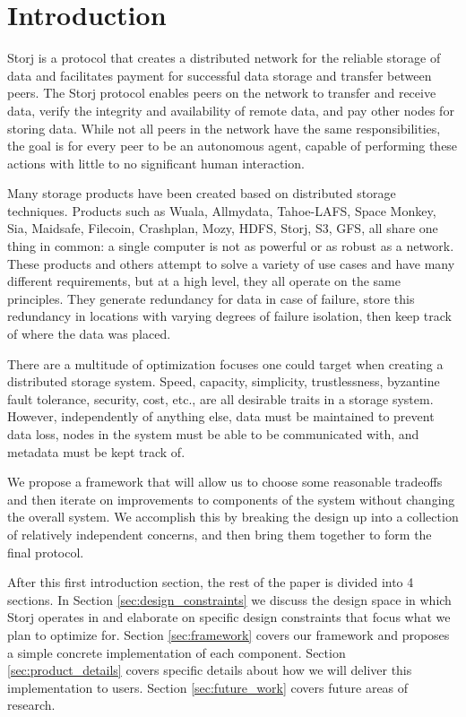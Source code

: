 \documentclass[a4paper,10pt]{article} \usepackage[utf8]{inputenc}
\begin{document}
\section{Introduction}

Storj is a protocol that creates a distributed network for the reliable storage
of data and facilitates payment for successful data storage and transfer
between peers.
The Storj protocol enables peers on the network to transfer and receive data,
verify the integrity and availability of remote data, and pay other nodes
for storing data.
While not all peers in the network have the same responsibilities,
the goal is for every peer to be an autonomous agent, capable of performing
these actions with little to no significant human interaction.

Many storage products have been created based on distributed storage techniques.
Products such as Wuala, Allmydata, Tahoe-LAFS, Space Monkey, Sia, Maidsafe,
Filecoin, Crashplan, Mozy, HDFS, Storj, S3, GFS, all share one thing in common:
a single computer is not as powerful or as robust as a network. These products
and others attempt to solve a variety of use cases and have many different
requirements, but at a high level, they all operate on the same principles. They
generate redundancy for data in case of failure, store this redundancy in
locations with varying degrees of failure isolation, then keep track of where
the data was placed.

There are a multitude of optimization focuses one could target when creating a
distributed storage system. Speed, capacity, simplicity, trustlessness,
byzantine fault tolerance, security, cost, etc., are all desirable traits in a
storage system. However, independently of anything else, data must be maintained to
prevent data loss, nodes in the system must be able to be communicated with, and
metadata must be kept track of.

We propose a framework that will allow us to choose some reasonable tradeoffs
and then iterate on improvements to components of the system without changing
the overall system.
We accomplish this by breaking the design up into a collection
of relatively independent concerns, and then bring them together to form the
final protocol.

After this first introduction section, the rest of the paper is divided into 4
sections. In Section \ref{sec:design_constraints} we discuss the design space
in which Storj operates in and elaborate on specific design constraints that
focus what we plan to optimize for.
Section \ref{sec:framework} covers our framework and proposes a simple
concrete implementation of each component.
Section \ref{sec:product_details} covers specific details
about how we will deliver this implementation to users. Section
\ref{sec:future_work} covers future areas of research.
\end{document}
